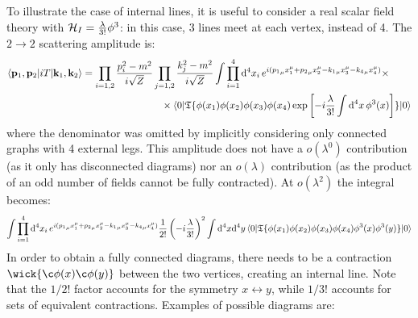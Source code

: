 To illustrate the case of internal lines, it is useful to consider a real scalar field theory with $ \mathcal{H}_I = \frac{\lambda}{3!} \phi^3 $: in this case, 3 lines meet at each vertex, instead of 4. The $ 2 \rightarrow 2 $ scattering amplitude is:
\begin{equation*}
  \begin{split}
    \braket{\mathbf{p}_1 , \mathbf{p}_2 | i T | \mathbf{k}_1 , \mathbf{k}_2}
    & = \prod_{i = 1,2} \frac{p_i^2 - m^2}{i \sqrt{Z}} \prod_{j = 1,2} \frac{k_j^2 - m^2}{i \sqrt{Z}} \int \prod_{i = 1}^4 \mathrm{d}^4x_i\, e^{i ({p_1}_\mu x_1^\mu + {p_2}_\mu x_2^\mu - {k_1}_\mu x_3^\mu - {k_4}_\mu x_4^\mu)} \times \\
    & \qquad \qquad \qquad \qquad \times \braket{0 | \mathfrak{T}\{\phi(x_1) \phi(x_2) \phi(x_3) \phi(x_4) \exp \left[ -i \frac{\lambda}{3!} \int \mathrm{d}^4x\, \phi^3(x) \right]\} | 0}
  \end{split}
\end{equation*}
where the denominator was omitted by implicitly considering only connected graphs with 4 external legs. This amplitude does not have a $ o(\lambda^0) $ contribution (as it only has disconnected diagrams) nor an $ o(\lambda) $ contribution (as the product of an odd number of fields cannot be fully contracted). At $ o(\lambda^2) $ the integral becomes:
\begin{equation*}
    \int \prod_{i = 1}^4 \mathrm{d}^4x_i\, e^{i ({p_1}_\mu x_1^\mu + {p_2}_\mu x_2^\mu - {k_1}_\mu x_3^\mu - {k_4}_\mu x_4^\mu)} \frac{1}{2!} \left( -i \frac{\lambda}{3!} \right)^2 \int \mathrm{d}^4x \mathrm{d}^4y \braket{0 | \mathfrak{T}\{\phi(x_1) \phi(x_2) \phi(x_3) \phi(x_4) \phi^3(x) \phi^3(y)\} | 0}
\end{equation*}
In order to obtain a fully connected diagrams, there needs to be a contraction $ \wick{\c\phi(x) \c\phi(y)} $ between the two vertices, creating an internal line. Note that the $ 1/2! $ factor accounts for the symmetry $ x \leftrightarrow y $, while $ 1/3! $ accounts for sets of equivalent contractions. Examples of possible diagrams are:
